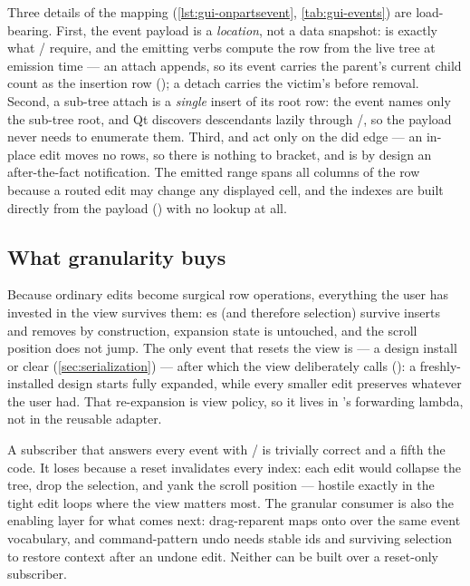 Three details of the mapping (\cref{lst:gui-onpartsevent}, \cref{tab:gui-events}) are load-bearing. First, the event payload is a \emph{location}, not
a data snapshot:  is exactly what
/ require, and the emitting verbs compute the row from
the live tree at emission time --- an attach appends, so its event carries the parent's current
child count as the insertion row (); a detach carries the
victim's  before removal. Second, a sub-tree attach is a \emph{single} insert
of its root row: the event names only the sub-tree root, and Qt discovers descendants lazily
through /, so the payload never needs to enumerate them. Third,
 and  act only on the did edge --- an in-place edit moves no rows,
so there is nothing to bracket, and  is by design an after-the-fact
notification. The emitted range spans all columns of the row because a routed edit may change any
displayed cell, and the indexes are built directly from the payload
() with no lookup at all.

\subsection{What granularity buys}\label{sec:gui-granularity}

Because ordinary edits become surgical row operations, everything the user has invested in the
view survives them: es (and therefore selection) survive inserts and
removes by construction, expansion state is untouched, and the scroll position does not jump.
The only event that resets the view is  --- a design install or clear
(\cref{sec:serialization}) --- after which the view deliberately calls 
(): a freshly-installed design starts fully expanded, while every
smaller edit preserves whatever the user had. That re-expansion is view policy, so it lives in
's forwarding lambda, not in the reusable adapter.

\begin{rejected}
A subscriber that answers every event with / is trivially correct
and a fifth the code. It loses because a reset invalidates every index: each edit would
collapse the tree, drop the selection, and yank the scroll position --- hostile exactly in the
tight edit loops where the view matters most. The granular consumer is also the enabling layer for
what comes next: drag-reparent maps onto  over the same event vocabulary, and
command-pattern undo needs stable ids and surviving selection to restore context after an
undone edit. Neither can be built over a reset-only subscriber.
\end{rejected}

